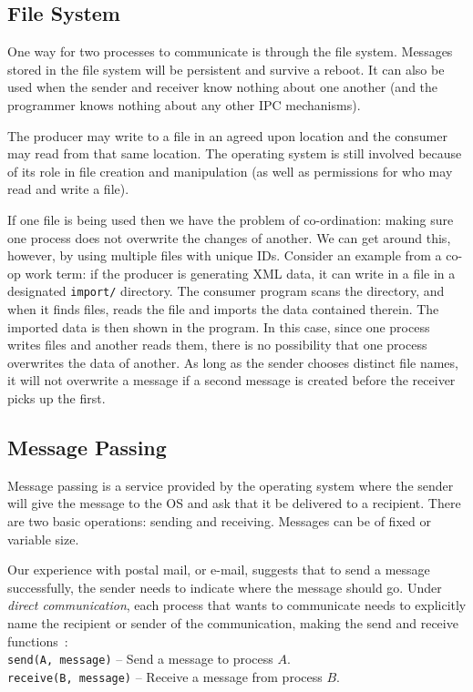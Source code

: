 \subsection*{File System}

One way for two processes to communicate is through the file system. Messages stored in the file system will be persistent and survive a reboot. It can also be used when the sender and receiver know nothing about one another (and the programmer knows nothing about any other IPC mechanisms).

The producer may write to a file in an agreed upon location and the consumer may read from that same location. The operating system is still involved because of its role in file creation and manipulation (as well as permissions for who may read and write a file).

If one file is being used then we have the problem of co-ordination: making sure one process does not overwrite the changes of another. We can get around this, however, by using multiple files with unique IDs. Consider an example from a co-op work term: if the producer is generating XML data, it can write in a file in a designated \texttt{import/} directory. The consumer program scans the directory, and when it finds files, reads the file and imports the data contained therein. The imported data is then shown in the program. In this case, since one process writes files and another reads them, there is no possibility that one process overwrites the data of another. As long as the sender chooses distinct file names, it will not overwrite a message if a second message is created before the receiver picks up the first.

\subsection*{Message Passing}

Message passing is a service provided by the operating system where the sender will give the message to the OS and ask that it be delivered to a recipient. There are two basic operations: sending and receiving. Messages can be of fixed or variable size.

Our experience with postal mail, or e-mail, suggests that to send a message successfully, the sender needs to indicate where the message should go. Under \textit{direct communication}, each process that wants to communicate needs to explicitly name the recipient or sender of the communication, making the send and receive functions~\cite{osc}:\\
\texttt{send(A, message)} -- Send a message to process $A$.\\
\texttt{receive(B, message)} -- Receive a message from process $B$.

